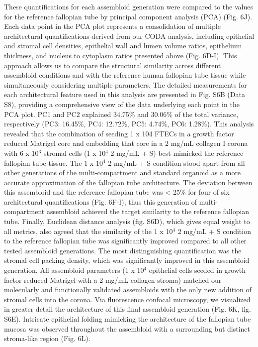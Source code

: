 \begin{refsection}
    These quantifications for each assembloid generation were compared to the values for the reference fallopian tube by principal component analysis (PCA) (Fig. 6J). Each data point in the PCA plot represents a consolidation of multiple architectural quantifications derived from our CODA analysis, including epithelial and stromal cell densities, epithelial wall and lumen volume ratios, epithelium thickness, and nucleus to cytoplasm ratios presented above (Fig. 6D-I). This approach allows us to compare the structural similarity across different assembloid conditions and with the reference human fallopian tube tissue while simultaneously considering multiple parameters. The detailed measurements for each architectural feature used in this analysis are presented in Fig. S6B (Data S8), providing a comprehensive view of the data underlying each point in the PCA plot. PC1 and PC2 explained 34.75\% and 30.06\% of the total variance, respectively (PC3: 16.45\%, PC4: 12.72\%, PC5: 4.74\%, PC6: 1.28\%). This analysis revealed that the combination of seeding 1 x 104 FTECs in a growth factor reduced Matrigel core and embedding that core in a 2 mg/mL collagen I corona with 6 x 10$^3$ stromal cells (1 x 10$^4$ 2 mg/mL + S) best mimicked the reference fallopian tube tissue. The 1 x 10$^4$ 2 mg/mL + S condition stood apart from all other generations of the multi-compartment and standard organoid as a more accurate approximation of the fallopian tube architecture. The deviation between this assembloid and the reference fallopian tube was < 25\% for four of six architectural quantifications (Fig. 6F-I), thus this generation of multi-compartment assembloid achieved the target similarity to the reference fallopian tube. Finally, Euclidean distance analysis (fig. S6D), which gives equal weight to all metrics, also agreed that the similarity of the 1 x 10$^4$ 2 mg/mL + S condition to the reference fallopian tube was significantly improved compared to all other tested assembloid generations. The most distinguishing quantification was the stromal cell packing density, which was significantly improved in this assembloid generation. All assembloid parameters (1 x 10$^4$ epithelial cells seeded in growth factor reduced Matrigel with a 2 mg/mL collagen stroma) matched our molecularly and functionally validated assembloids with the only new addition of stromal cells into the corona. Via fluorescence confocal microscopy, we visualized in greater detail the architecture of this final assembloid generation (Fig. 6K, fig. S6E). Intricate epithelial folding mimicking the architecture of the fallopian tube mucosa was observed throughout the assembloid with a surrounding but distinct stroma-like region (Fig. 6L).
    

\end{refsection}
